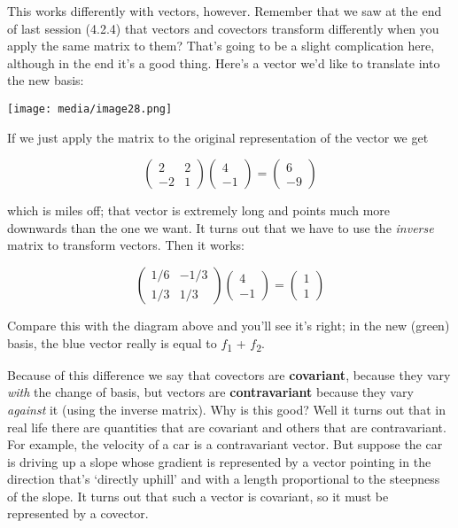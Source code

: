 \documentclass[oneside,english]{amsbook}
\numberwithin{section}{chapter}
\theoremstyle{plain}
\theoremstyle{definition}
\begin{document}
This works differently with vectors, however. Remember that we saw at
the end of last session (4.2.4) that vectors and covectors transform
differently when you apply the same matrix to them? That's going to be a
slight complication here, although in the end it's a good thing. Here's
a vector we'd like to translate into the new basis:

\texttt{[image: media/image28.png]}

If we just apply the matrix to the original representation of the vector
we get

\[\begin{pmatrix}
	2 & 2 \\
	- 2 & 1
\end{pmatrix}\begin{pmatrix}
	4 \\
	- 1
\end{pmatrix} = \begin{pmatrix}
	6 \\
	- 9
\end{pmatrix}\]

which is miles off; that vector is extremely long and points much more
downwards than the one we want. It turns out that we have to use the
\emph{inverse} matrix to transform vectors. Then it works:

\[\begin{pmatrix}
	1/6 & - 1/3 \\
	1/3 & 1/3
\end{pmatrix}\begin{pmatrix}
	4 \\
	- 1
\end{pmatrix} = \begin{pmatrix}
	1 \\
	1
\end{pmatrix}\]

Compare this with the diagram above and you'll see it's right; in the
new (green) basis, the blue vector really is equal to
$f$\textsubscript{1} + $f$\textsubscript{2}.

Because of this difference we say that covectors are \textbf{covariant},
because they vary \emph{with} the change of basis, but vectors are
\textbf{contravariant} because they vary \emph{against} it (using the
inverse matrix). Why is this good? Well it turns out that in real life
there are quantities that are covariant and others that are
contravariant. For example, the velocity of a car is a contravariant
vector. But suppose the car is driving up a slope whose gradient is
represented by a vector pointing in the direction that's `directly
uphill' and with a length proportional to the steepness of the slope.
It turns out that such a vector is covariant, so it must be represented
by a covector.
\end{document}
